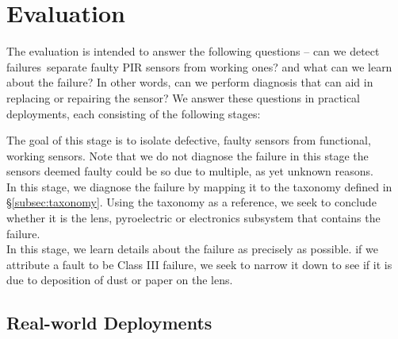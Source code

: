 

\section{Evaluation}
\label{sec:evaluation}
The evaluation is intended to answer the following questions -- \ca can we detect failures~\ie separate faulty PIR sensors from working ones? and \cb what can we learn about the failure? In other words, can we perform diagnosis that can aid in replacing or repairing the sensor? We answer these questions in practical deployments, %
each consisting of the following stages:

 The goal of this stage is to isolate defective, faulty sensors from functional, working sensors. Note that we do not diagnose the failure in this stage \ie the sensors deemed faulty could be so due to multiple, as yet unknown reasons.\\
\hspace*{2ex} In this stage, we diagnose the failure by mapping it to the taxonomy defined in \S\ref{subsec:taxonomy}. Using the taxonomy as a reference, we seek to conclude whether it is the lens, pyroelectric or electronics subsystem that contains the failure.\\
\hspace*{2ex} In this stage, we learn details about the failure as precisely as possible. \Eg if we attribute a fault to be Class III failure, we seek to narrow it down to see if it is due to deposition of dust or paper on the lens.





\subsection{Real-world Deployments}
\label{subsec:deployment}


